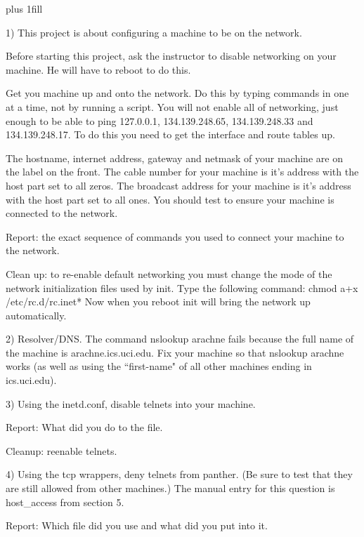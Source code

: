 
\rightskip=0pt plus 1fill

\parindent 0pt

1) This project is about configuring a machine to be on the network.

Before starting this project, ask the instructor to disable networking
on your machine. He will have to reboot to do this.

Get you machine up and onto the network.
Do this by typing commands in one at a time, not by running a script.
You will not enable all of networking, just enough to be
able to ping {\ltt{}127.0.0.1}, {\ltt{}134.139.248.65},
{\ltt{}134.139.248.33} and {\ltt{}134.139.248.17}.
To do this you need to get the interface and route tables up.

The hostname, internet address, gateway and netmask of your machine are
on the label on the front.
The cable number for your machine is it's address with the host
part set to all zeros.
The broadcast address for your machine is it's address with the host
part set to all ones.
You should test to ensure your machine is connected to the network.

Report: the exact sequence of commands you used to connect your machine
to the network.

Clean up: to re-enable default networking you must change the mode
of the network initialization files used by {\ltt{}init}.
Type the following command:
\hfill\break
{\ltt{}chmod a+x /etc/rc.d/rc.inet*}
\hfill\break
Now when you reboot {\ltt{}init} will bring the network up automatically.

2) Resolver/DNS. The command {\ltt{}nslookup arachne} fails because the full
name of the machine is {\ltt{}arachne.ics.uci.edu}.
Fix your machine so that {\ltt{}nslookup arachne} works (as well as using
the ``first-name" of all other machines ending in {\ltt{}ics.uci.edu}).

3) Using the {\ltt{}inetd.conf}, disable telnets into your machine.

Report: What did you do to the file.

Cleanup: reenable telnets.

4) Using the tcp wrappers, deny telnets from {\ltt{}panther}. (Be sure to test
that they are still allowed from other machines.)
The manual entry for this question is {\ltt{}host_access} from section 5.

Report: Which file did you use and what did you put into it.


